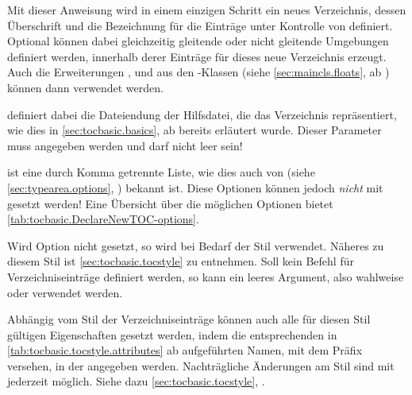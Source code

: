 \begin{Declaration}
\end{Declaration}%
Mit dieser Anweisung wird in einem
einzigen Schritt ein neues Verzeichnis, dessen Überschrift und die Bezeichnung
für die Einträge unter Kontrolle von  definiert. Optional
können dabei gleichzeitig gleitende oder nicht gleitende Umgebungen definiert
werden, innerhalb derer %
 Einträge für
dieses neue Verzeichnis erzeugt. Auch die Erweiterungen
,  und
 aus den \KOMAScript-Klassen (siehe
\autoref{sec:maincls.floats}, ab )
können dann verwendet werden.

 definiert dabei die Dateiendung der Hilfsdatei, die
das Verzeichnis repräsentiert, wie dies in \autoref{sec:tocbasic.basics}, ab
 bereits erläutert
wurde. Dieser Parameter muss angegeben werden und darf
nicht leer sein!

 ist eine durch Komma getrennte Liste, wie dies auch von
 (siehe \autoref{sec:typearea.options},
) bekannt ist. Diese
Optionen können jedoch \emph{nicht} mit
 gesetzt werden! Eine
Übersicht über die möglichen Optionen bietet
\autoref{tab:tocbasic.DeclareNewTOC-options}\iffalse ab
\autopageref{tab:tocbasic.DeclareNewTOC-options}\fi.

Wird Option
 nicht gesetzt, so wird bei Bedarf der Stil
 verwendet. Näheres zu diesem Stil ist
\autoref{sec:tocbasic.tocstyle} zu entnehmen. Soll kein Befehl für
Verzeichniseinträge definiert werden, so kann ein leeres Argument, also
wahlweise \iffree{}{\unskip} oder
 verwendet werden.

Abhängig vom Stil der
Verzeichniseinträge können auch alle für diesen Stil gültigen Eigenschaften
gesetzt werden, indem die entsprechenden in
\autoref{tab:tocbasic.tocstyle.attributes} ab
 aufgeführten Namen, mit dem
Präfix  versehen, in der  angegeben
werden. Nachträgliche Änderungen am Stil sind mit
%
%
 jederzeit
möglich. Siehe dazu \autoref{sec:tocbasic.tocstyle},
.

